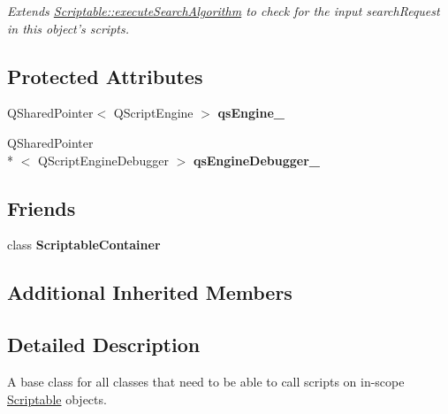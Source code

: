 \begin{DoxyCompactItemize}
\begin{DoxyCompactList}\small\item\em Extends \hyperlink{class_picto_1_1_u_i_enabled_a97cb540bf9702a5af91a9eeddde39db9}{Scriptable\-::execute\-Search\-Algorithm} to check for the input search\-Request in this object's scripts. \end{DoxyCompactList}\end{DoxyCompactItemize}
\subsection*{Protected Attributes}
\begin{DoxyCompactItemize}
\item 
\hypertarget{class_picto_1_1_scriptable_container_ab5c2f2b808f14d1722c77451dcc84a24}{Q\-Shared\-Pointer$<$ Q\-Script\-Engine $>$ {\bfseries qs\-Engine\-\_\-}}\label{class_picto_1_1_scriptable_container_ab5c2f2b808f14d1722c77451dcc84a24}

\item 
\hypertarget{class_picto_1_1_scriptable_container_a15a52a61d280e688b20b23a0f63586e1}{Q\-Shared\-Pointer\\*
$<$ Q\-Script\-Engine\-Debugger $>$ {\bfseries qs\-Engine\-Debugger\-\_\-}}\label{class_picto_1_1_scriptable_container_a15a52a61d280e688b20b23a0f63586e1}

\end{DoxyCompactItemize}
\subsection*{Friends}
\begin{DoxyCompactItemize}
\item 
\hypertarget{class_picto_1_1_scriptable_container_a48b61ce110d838ebb3089c9f25fa7ba4}{class {\bfseries Scriptable\-Container}}\label{class_picto_1_1_scriptable_container_a48b61ce110d838ebb3089c9f25fa7ba4}

\end{DoxyCompactItemize}
\subsection*{Additional Inherited Members}


\subsection{Detailed Description}
A base class for all classes that need to be able to call scripts on in-\/scope \hyperlink{class_picto_1_1_scriptable}{Scriptable} objects. 

